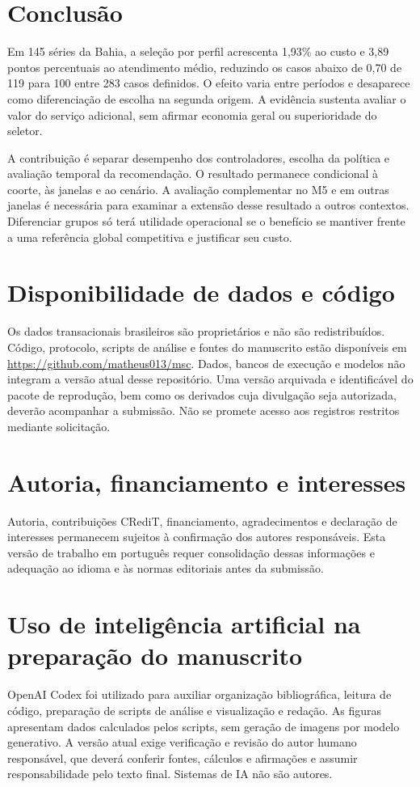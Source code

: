 \documentclass[preprint,12pt]{elsarticle}
\begin{document}
\section{Conclusão}
Em 145 séries da Bahia, a seleção por perfil acrescenta 1,93\% ao custo e 3,89 pontos percentuais ao atendimento médio, reduzindo os casos abaixo de 0,70 de 119 para 100 entre 283 casos definidos. O efeito varia entre períodos e desaparece como diferenciação de escolha na segunda origem. A evidência sustenta avaliar o valor do serviço adicional, sem afirmar economia geral ou superioridade do seletor.

A contribuição é separar desempenho dos controladores, escolha da política e avaliação temporal da recomendação. O resultado permanece condicional à coorte, às janelas e ao cenário. A avaliação complementar no M5 e em outras janelas é necessária para examinar a extensão desse resultado a outros contextos. Diferenciar grupos só terá utilidade operacional se o benefício se mantiver frente a uma referência global competitiva e justificar seu custo.

\section*{Disponibilidade de dados e código}
Os dados transacionais brasileiros são proprietários e não são redistribuídos. Código, protocolo, scripts de análise e fontes do manuscrito estão disponíveis em \url{https://github.com/matheus013/msc}. Dados, bancos de execução e modelos não integram a versão atual desse repositório. Uma versão arquivada e identificável do pacote de reprodução, bem como os derivados cuja divulgação seja autorizada, deverão acompanhar a submissão. Não se promete acesso aos registros restritos mediante solicitação.
\section*{Autoria, financiamento e interesses}
Autoria, contribuições CRediT, financiamento, agradecimentos e declaração de interesses permanecem sujeitos à confirmação dos autores responsáveis. Esta versão de trabalho em português requer consolidação dessas informações e adequação ao idioma e às normas editoriais antes da submissão.
\section*{Uso de inteligência artificial na preparação do manuscrito}
OpenAI Codex foi utilizado para auxiliar organização bibliográfica, leitura de código, preparação de scripts de análise e visualização e redação. As figuras apresentam dados calculados pelos scripts, sem geração de imagens por modelo generativo. A versão atual exige verificação e revisão do autor humano responsável, que deverá conferir fontes, cálculos e afirmações e assumir responsabilidade pelo texto final. Sistemas de IA não são autores.



\end{document}
